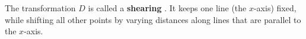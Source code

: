 \documentclass{ximera}
\begin{document}
\begin{example}
\begin{enumerate}
\begin{enumerate}
\begin{solution}
            The transformation
            $D$ is called a \textbf{shearing}%
            . It keeps one line (the
            $x$-axis) fixed, while shifting all other points by varying
            distances along lines that are parallel to the $x$-axis.

          \end{solution}
        \end{enumerate}

        

        \end{enumerate}

    \end{example}
\end{document}

